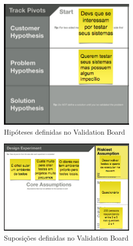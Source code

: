 \begin{figure}
  \centering
  \includegraphics[width=0.6\textwidth]{imagens/hyphotesis.png}
  \caption{Hipóteses definidas no Validation Board}
  \label{fig:LABEL_FIG_2}
\end{figure}

\begin{figure}
  \centering
  \includegraphics[width=0.6\textwidth]{imagens/assumptions.png}
  \caption{Suposições definidas no Validation Board}
  \label{fig:LABEL_FIG_3}
\end{figure}

